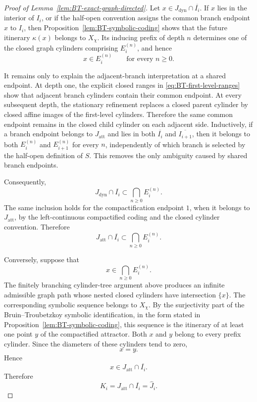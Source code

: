 \documentclass[11pt]{amsart}
\theoremstyle{plain}
\theoremstyle{definition}
\theoremstyle{remark}
\begin{document}
\begin{proof}[Proof of Lemma~\ref{lem:BT-exact-graph-directed}]
Let \(x\in J_{\mathrm{dyn}}\cap\overline{I_i}\). If \(x\) lies
in the interior of \(I_i\), or if the half-open convention assigns the
common branch endpoint \(x\) to \(I_i\), then
Proposition~\ref{lem:BT-symbolic-coding} shows that the future itinerary
\(\kappa(x)\) belongs to \(X_\chi\). Its inducing prefix of depth \(n\)
determines one of the closed graph cylinders comprising \(E_i^{(n)}\),
and hence
\[
        x\in E_i^{(n)}
        \qquad
        \text{for every }n\geq0.
\]

It remains only to explain the adjacent-branch interpretation at a shared
endpoint. At depth one, the explicit closed ranges in
\eqref{eq:BT-first-level-ranges} show that adjacent branch cylinders contain
their common endpoint. At every subsequent depth, the stationary refinement
replaces a closed parent cylinder by closed affine images of the first-level
cylinders. Therefore the same common endpoint remains in the closed child
cylinder on each adjacent side. Inductively, if a branch endpoint belongs
to \(J_{\mathrm{att}}\) and lies in both \(\overline{I_i}\) and
\(\overline{I_{i+1}}\), then it belongs to both \(E_i^{(n)}\) and
\(E_{i+1}^{(n)}\) for every \(n\), independently of which branch is selected
by the half-open definition of \(S\). This removes the only ambiguity caused
by shared branch endpoints.

Consequently,
\[
        J_{\mathrm{dyn}}\cap\overline{I_i}
        \subset
        \bigcap_{n\geq0}E_i^{(n)}.
\]
The same inclusion holds for the compactification endpoint \(1\), when it
belongs to \(J_{\mathrm{att}}\), by the left-continuous compactified coding and the closed
cylinder convention. Therefore
\[
        J_{\mathrm{att}}\cap\overline{I_i}
        \subset
        \bigcap_{n\geq0}E_i^{(n)}.
\]

Conversely, suppose that
\[
        x\in\bigcap_{n\geq0}E_i^{(n)}.
\]
The finitely branching cylinder-tree argument above produces an infinite
admissible graph path whose nested closed cylinders have intersection
\(\{x\}\). The corresponding symbolic sequence belongs to \(X_\chi\).
By the surjectivity part of the Bruin--Troubetzkoy symbolic identification,
in the form stated in Proposition~\ref{lem:BT-symbolic-coding}, this sequence is
the itinerary of at least one point \(y\) of the compactified attractor.
Both \(x\) and \(y\) belong to every prefix cylinder. Since the diameters of
these cylinders tend to zero,
\[
        x=y.
\]
Hence
\[
        x\in J_{\mathrm{att}}\cap\overline{I_i}.
\]
Therefore
\[
        K_i=J_{\mathrm{att}}\cap\overline{I_i}=\widehat J_i.
\]


\end{proof}
\end{document}
